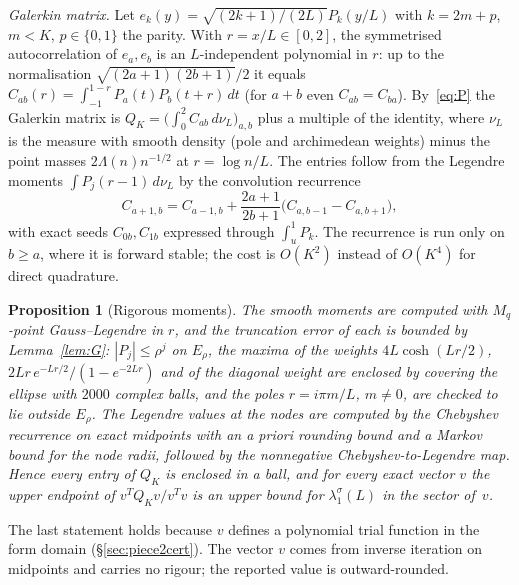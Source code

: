 \documentclass[11pt]{amsart}
\newtheorem{proposition}[theorem]{Proposition}
\theoremstyle{definition}
\theoremstyle{remark}
\numberwithin{equation}{section}
\begin{document}
\emph{Galerkin matrix.} Let $e_k(y)=\sqrt{(2k+1)/(2L)}P_k(y/L)$ with $k=2m+p$, $m<K$, $p\in\{0,1\}$ the parity. With $r=x/L\in[0,2]$, the symmetrised autocorrelation of $e_a,e_b$ is an $L$-independent polynomial in $r$: up to the normalisation $\sqrt{(2a+1)(2b+1)}/2$ it equals $C_{ab}(r)=\int_{-1}^{1-r}P_a(t)P_b(t+r)\,dt$ (for $a+b$ even $C_{ab}=C_{ba}$). By~\eqref{eq:P} the Galerkin matrix is $Q_K=\bigl(\int_0^2C_{ab}\,d\nu_L\bigr)_{a,b}$ plus a multiple of the identity, where $\nu_L$ is the measure with smooth density (pole and archimedean weights) minus the point masses $2\Lambda(n)n^{-1/2}$ at $r=\log n/L$. The entries follow from the Legendre moments $\int P_j(r-1)\,d\nu_L$ by the convolution recurrence~\cite{HaleTownsend}
\[
C_{a+1,b}=C_{a-1,b}+\frac{2a+1}{2b+1}\bigl(C_{a,b-1}-C_{a,b+1}\bigr),
\]
with exact seeds $C_{0b},C_{1b}$ expressed through $\int_u^1P_k$. The recurrence is run only on $b\ge a$, where it is forward stable; the cost is $O(K^2)$ instead of $O(K^4)$ for direct quadrature.

\begin{proposition}[Rigorous moments]\label{prop:upper}
The smooth moments are computed with $M_q$-point Gauss--Legendre in $r$, and the truncation error of each is bounded by Lemma~\ref{lem:G}: $|P_j|\le\rho^j$ on $E_\rho$, the maxima of the weights $4L\cosh(Lr/2)$, $2Lr\,e^{-Lr/2}/(1-e^{-2Lr})$ and of the diagonal weight are enclosed by covering the ellipse with $2000$ complex balls, and the poles $r=i\pi m/L$, $m\ne0$, are checked to lie outside $E_\rho$. The Legendre values at the nodes are computed by the Chebyshev recurrence on exact midpoints with an a priori rounding bound and a Markov bound for the node radii, followed by the nonnegative Chebyshev-to-Legendre map. Hence every entry of $Q_K$ is enclosed in a ball, and for every exact vector $v$ the upper endpoint of $v^TQ_Kv/v^Tv$ is an upper bound for $\lambda_1^\sigma(L)$ in the sector of~$v$.
\end{proposition}
The last statement holds because $v$ defines a polynomial trial function in the form domain (\S\ref{sec:piece2cert}). The vector $v$ comes from inverse iteration on midpoints and carries no rigour; the reported value is outward-rounded.
\end{document}
